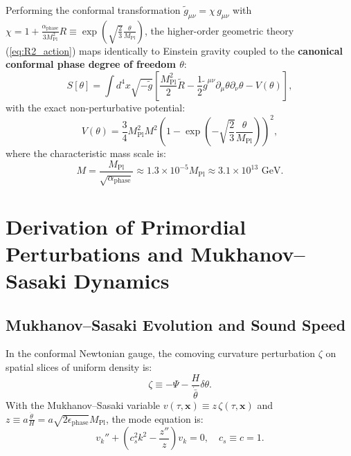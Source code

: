 \documentclass[11pt,a4paper]{article}
\begin{document}
Performing the conformal transformation $\tilde{g}_{\mu\nu} = \chi \, g_{\mu\nu}$ with $\chi = 1 + \frac{\alpha_{\mathrm{phase}}}{3 M_{\mathrm{Pl}}^2} R \equiv \exp\left(\sqrt{\frac{2}{3}} \frac{\theta}{M_{\mathrm{Pl}}}\right)$, the higher-order geometric theory (\ref{eq:R2_action}) maps identically to Einstein gravity coupled to the \textbf{canonical conformal phase degree of freedom $\theta$}:
\begin{equation}
S[\theta] = \int d^4x \sqrt{-\tilde{g}} \left[ \frac{M_{\mathrm{Pl}}^2}{2} \tilde{R} - \frac{1}{2} \tilde{g}^{\mu\nu} \partial_\mu \theta \partial_\nu \theta - V(\theta) \right],
\end{equation}
with the exact non-perturbative potential:
\begin{equation}
V(\theta) = \frac{3}{4} M_{\mathrm{Pl}}^2 M^2 \left( 1 - \exp\left(-\sqrt{\frac{2}{3}}\frac{\theta}{M_{\mathrm{Pl}}}\right) \right)^2,
\label{eq:V_theta}
\end{equation}
where the characteristic mass scale is:
\begin{equation}
M = \frac{M_{\mathrm{Pl}}}{\sqrt{\alpha_{\mathrm{phase}}}} \approx 1.3 \times 10^{-5} M_{\mathrm{Pl}} \approx 3.1 \times 10^{13}\text{ GeV}.
\end{equation}

\section{Derivation of Primordial Perturbations and Mukhanov--Sasaki Dynamics}

\subsection{Mukhanov--Sasaki Evolution and Sound Speed}
In the conformal Newtonian gauge, the comoving curvature perturbation $\zeta$ on spatial slices of uniform density is:
\begin{equation}
\zeta \equiv -\Psi - \frac{H}{\dot{\bar{\theta}}} \delta\theta.
\end{equation}
With the Mukhanov--Sasaki variable $v(\tau, \mathbf{x}) \equiv z \, \zeta(\tau, \mathbf{x})$ and $z \equiv a \frac{\dot{\theta}}{H} = a \sqrt{2\epsilon_{\mathrm{phase}}} M_{\mathrm{Pl}}$, the mode equation is:
\begin{equation}
v_k'' + \left( c_s^2 k^2 - \frac{z''}{z} \right) v_k = 0, \quad c_s \equiv c = 1.
\end{equation}
\end{document}
